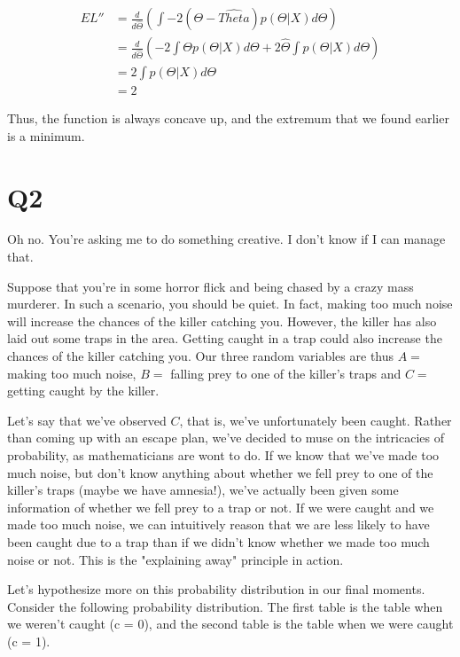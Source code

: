 \documentclass{article}
\begin{document}
\begin{align*}
EL'' &= \frac{d}{d \hat{\Theta}}(\int -2(\Theta - \hat{Theta})p(\Theta | X) d \Theta) \\
     &= \frac{d}{d \hat{\Theta}}(-2 \int \Theta p(\Theta | X) d \Theta + 2 \hat{\Theta} \int p(\Theta | X) d \Theta) \\
     &= 2 \int p(\Theta | X) d \Theta \\
     &= 2
\end{align*}

Thus, the function is always concave up, and the extremum that we found earlier 
is a minimum.

\section{Q2}

Oh no. You're asking me to do something creative. I don't know if I can manage 
that.

Suppose that you're in some horror flick and being chased by a crazy mass 
murderer. In such a scenario, you should be quiet. In fact, making too much 
noise will increase the chances of the killer catching you. However, the killer 
has also laid out some traps in the area. Getting caught in a trap could also 
increase the chances of the killer catching you. Our three random variables are 
thus $ A = $ making too much noise, $ B = $ falling prey to one of the killer's 
traps and $ C = $ getting caught by the killer.

Let's say that we've observed $ C $, that is, we've unfortunately been caught. 
Rather than coming up with an escape plan, we've decided to muse on the 
intricacies of probability, as mathematicians are wont to do. If we know that 
we've made too much noise, but don't know anything about whether we fell prey 
to one of the killer's traps (maybe we have amnesia!), we've actually been given some information of 
whether we fell prey to a trap or not. If we were caught and we made 
too much noise, we can intuitively reason that we are less likely to have been 
caught due to a trap than if we didn't know whether we made too much noise or 
not. This is the "explaining away" principle in action.

Let's hypothesize more on this probability distribution in our final moments. 
Consider the following probability distribution. The first table is the table 
when we weren't caught (c = 0), and the second table is the table when we were 
caught (c = 1).
\end{document}
